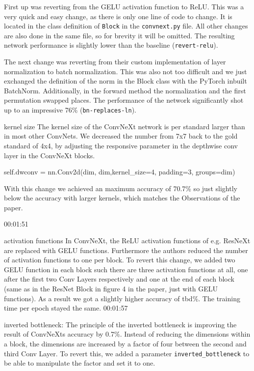 \documentclass{article}
\begin{document}
First up was reverting from the GELU activation function to ReLU\@.
This was a very quick and easy change, as there is only one line of code to change.
It is located in the class definition of \texttt{Block} in the \texttt{convnext.py} file.
All other changes are also done in the same file, so for brevity it will be omitted.
The resulting network performance is slightly lower than the baseline (\texttt{revert-relu}).

The next change was reverting from their custom implementation of layer normalization to batch normalization.
This was also not too difficult and we just exchanged the definition of the norm in the Block class with the PyTorch inbuilt BatchNorm.
Additionally, in the forward method the normalization and the first permutation swapped places.
The performance of the network significantly shot up to an impressive 76\% (\texttt{bn-replaces-ln}).

kernel size
The kernel size of the ConvNeXt network is per standard larger than in most other ConvNets.
We decreased the number from 7x7 back to the gold standard of 4x4, by adjusting the responsive parameter in the depthwise conv layer in the ConvNeXt blocks.
\begin{python}
self.dwconv = nn.Conv2d(dim, dim,kernel_size=4, padding=3, groups=dim)
\end{python}

With this change we achieved an maximum accuracy of 70.7\% so just slightly below the accuracy with larger kernels, which matches the Observations of the paper.

00:01:51

activation functions
In ConvNeXt, the ReLU activation functions of e.g. ResNeXt are replaced with GELU functions.
Furthermore the authors reduced the number of activation functions to one per block.
To revert this change, we added two GELU function in each block such there are three activation functions at all, one after the first two Conv Layers respectively and one at the end of each block (same as in the ResNet Block in figure 4 in the paper, just with GELU functions).
As a result we got a slightly higher accuracy of tbd\%.
The training time per epoch stayed the same.
00:01:57

inverted bottleneck: The principle of the inverted bottleneck is improving the result of ConvNeXts accuracy by 0.7\%.
Instead of reducing the dimensions within a block, the dimensions are increased by a factor of four between the second and third Conv Layer.
To revert this, we added a parameter \texttt{inverted\_bottleneck}
to be able to manipulate the factor and set it to one.
\end{document}
